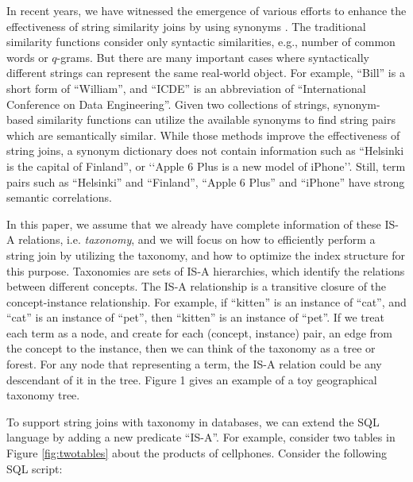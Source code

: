 In recent years, we have witnessed the emergence of various efforts to enhance the effectiveness of string similarity joins by using synonyms \cite{conf/sigmod/LuLWLW13,conf/icde/ArasuCK08,conf/cpm/BarbayGMR06,conf/vldb/ArvindSR09}.
The traditional similarity functions consider only syntactic similarities, e.g., number of common
words or $q$-grams. But there are many important cases where syntactically different
strings can represent the same real-world object. For example,
``\textsf{Bill}'' is a short form of ``\textsf{William}'', and ``\textsf{ICDE}'' is an abbreviation of  ``\textsf{International Conference on Data Engineering}''.  Given two collections of strings,  synonym-based similarity functions can utilize the available synonyms to find string pairs which are semantically similar. While those methods improve the effectiveness of string joins, a synonym dictionary does not contain information such as
``\textsf{Helsinki is the capital of Finland}'', or `\textsf{`Apple 6 Plus is a new model of iPhone}''. Still, term pairs such as ``\textsf{Helsinki}'' and ``\textsf{Finland}'', ``\textsf{Apple 6 Plus}'' and ``\textsf{iPhone}''  have strong semantic correlations.


In this paper, we assume that we already have complete
information of these IS-A relations, i.e. \textit{taxonomy}, and we will focus on how
to efficiently perform a string join by utilizing the taxonomy, and how to optimize the index structure
for this purpose.  Taxonomies are sets of IS-A hierarchies, which identify the relations between different concepts. The IS-A relationship
is a transitive closure of the concept-instance relationship.
For example, if ``\textsf{kitten}'' is an instance of ``\textsf{cat}'', and
``\textsf{cat}'' is an instance of ``\textsf{pet}'', then ``\textsf{kitten}'' is an instance
of ``\textsf{pet}''. If we treat each term as a node, and create
for each (concept, instance) pair, an edge from the concept
to the instance, then we can think of the taxonomy as a tree or forest. For any node that representing a term,
the IS-A relation could be any descendant of it in the tree. Figure
1 gives an example of a toy geographical taxonomy tree.




To support string joins with taxonomy in databases, we can extend the SQL language by adding a new predicate ``IS-A''. For example,
consider two tables in Figure \ref{fig:twotables} about the products of cellphones.  Consider the following SQL script:

